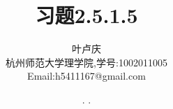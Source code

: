 \documentclass[a4paper, 12pt]{article} %
\makeatletter
\renewcommand{\maketitle}{ %
  \renewcommand\refname{参考文献}
  \newcommand{\D}{\displaystyle}\newcommand{\ri}{\Rightarrow}
  \newcommand{\ds}{\displaystyle} \renewcommand{\ni}{\noindent}
  \newcommand{\pa}{\partial} \newcommand{\Om}{\Omega}
  \newcommand{\om}{\omega} \newcommand{\sik}{\sum_{i=1}^k}
  \newcommand{\vov}{\Vert\omega\Vert} \newcommand{\Umy}{U_{\mu_i,y^i}}
  \newcommand{\lamns}{\lambda_n^{^{\scriptstyle\sigma}}}
  \newcommand{\chiomn}{\chi_{_{\Omega_n}}}
  \newcommand{\ullim}{\underline{\lim}} \newcommand{\bsy}{\boldsymbol}
  \newcommand{\mvb}{\mathversion{bold}} \newcommand{\la}{\lambda}
  \newcommand{\La}{\Lambda} \newcommand{\va}{\varepsilon}
  \newcommand{\be}{\beta} \newcommand{\al}{\alpha}
  \newcommand{\dis}{\displaystyle} \newcommand{\R}{{\mathbb R}}
  \newcommand{\N}{{\mathbb N}} \newcommand{\cF}{{\mathcal F}}
  \newcommand{\gB}{{\mathfrak B}} \newcommand{\eps}{\epsilon}
  \begin{flushright} %
    {\LARGE\@title} %
    
    \vspace{50pt} %
    
    {\large\@author} %
    \\\@date %
    
    \vspace{40pt} %
  \end{flushright}
}
\makeatother
\begin{document}
\title{\textbf{习题2.5.1.5}} 
\author{\small{叶卢庆}\\{\small{杭州师范大学理学院,学号:1002011005}}\\{\small{Email:h5411167@gmail.com}}} %
\renewcommand{\today}{\number\year. \number\month. \number\day}
\date{\today} %



\maketitle %






\end{document}
